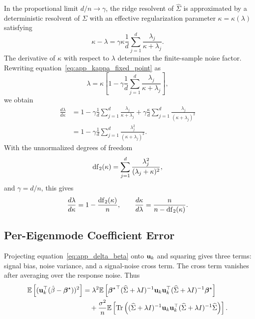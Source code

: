 In the proportional limit $d/n\to\gamma$, the ridge resolvent of $\widehat{\Sigma}$ is approximated by a deterministic resolvent of $\Sigma$ with an effective regularization parameter $\kappa=\kappa(\lambda)$ satisfying
\begin{equation}
    \kappa-\lambda
    =
    \gamma\kappa\frac{1}{d}\sum_{j=1}^{d}\frac{\lambda_j}{\kappa+\lambda_j}.
    \label{eq:app_kappa_fixed_point}
\end{equation}
The derivative of $\kappa$ with respect to $\lambda$ determines the finite-sample noise factor. Rewriting equation~\eqref{eq:app_kappa_fixed_point} as
\begin{equation}
    \lambda =
    \kappa\left[
    1-\gamma\frac{1}{d}\sum_{j=1}^{d}\frac{\lambda_j}{\kappa+\lambda_j}
    \right],
\end{equation}
we obtain
\begin{align}
    \frac{d\lambda}{d\kappa}
    &=
    1-\gamma\frac{1}{d}\sum_{j=1}^{d}\frac{\lambda_j}{\kappa+\lambda_j}
    +\gamma\frac{\kappa}{d}\sum_{j=1}^{d}\frac{\lambda_j}{(\kappa+\lambda_j)^2} \\
    &=
    1-\gamma\frac{1}{d}\sum_{j=1}^{d}\frac{\lambda_j^2}{(\kappa+\lambda_j)^2}.
\end{align}
With the unnormalized degrees of freedom
\begin{equation}
    \mathrm{df}_{2}(\kappa)=\sum_{j=1}^{d}\frac{\lambda_j^2}{(\lambda_j+\kappa)^2},
\end{equation}
and $\gamma=d/n$, this gives
\begin{equation}
    \frac{d\lambda}{d\kappa}=1-\frac{\mathrm{df}_{2}(\kappa)}{n},
    \qquad
    \frac{d\kappa}{d\lambda}=\frac{n}{n-\mathrm{df}_{2}(\kappa)}.
    \label{eq:app_dkappa}
\end{equation}

\subsection{Per-Eigenmode Coefficient Error}

Projecting equation~\eqref{eq:app_delta_beta} onto $\mathbf{u}_k$ and squaring gives three terms: signal bias, noise variance, and a signal-noise cross term. The cross term vanishes after averaging over the response noise. Thus
\begin{align}
    \mathbb{E}\left[(\mathbf{u}_k^\top(\hat{\beta}-\boldsymbol{\beta}^{\star}))^2\right]
    &=
    \lambda^2
    \mathbb{E}\left[
    {\boldsymbol{\beta}^{\star}}^{\top}(\widehat{\Sigma}+\lambda I)^{-1}
    \mathbf{u}_k\mathbf{u}_k^\top
    (\widehat{\Sigma}+\lambda I)^{-1}\boldsymbol{\beta}^{\star}
    \right]
    \nonumber\\
    &\quad+
    \frac{\sigma^2}{n}
    \mathbb{E}\left[
    \operatorname{Tr}\left(
    (\widehat{\Sigma}+\lambda I)^{-1}
    \mathbf{u}_k\mathbf{u}_k^\top
    (\widehat{\Sigma}+\lambda I)^{-1}
    \widehat{\Sigma}
    \right)\right].
    \label{eq:app_perpc_start}
\end{align}

